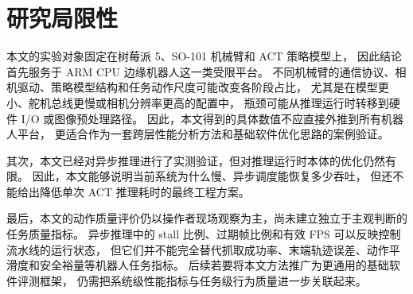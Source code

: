 \section{研究局限性}

本文的实验对象固定在树莓派 5、SO-101 机械臂和 ACT 策略模型上，
因此结论首先服务于 ARM CPU 边缘机器人这一类受限平台。
不同机械臂的通信协议、相机驱动、策略模型结构和任务动作尺度可能改变各阶段占比，
尤其是在模型更小、舵机总线更慢或相机分辨率更高的配置中，
瓶颈可能从推理运行时转移到硬件 I/O 或图像预处理路径。
因此，本文得到的具体数值不应直接外推到所有机器人平台，
更适合作为一套跨层性能分析方法和基础软件优化思路的案例验证。

其次，本文已经对异步推理进行了实测验证，但对推理运行时本体的优化仍然有限。
因此，本文能够说明当前系统为什么慢、异步调度能恢复多少吞吐，
但还不能给出降低单次 ACT 推理耗时的最终工程方案。

最后，本文的动作质量评价仍以操作者现场观察为主，尚未建立独立于主观判断的任务质量指标。
异步推理中的 stall 比例、过期帧比例和有效 FPS 可以反映控制流水线的运行状态，
但它们并不能完全替代抓取成功率、末端轨迹误差、动作平滑度和安全裕量等机器人任务指标。
后续若要将本文方法推广为更通用的基础软件评测框架，
仍需把系统级性能指标与任务级行为质量进一步关联起来。
